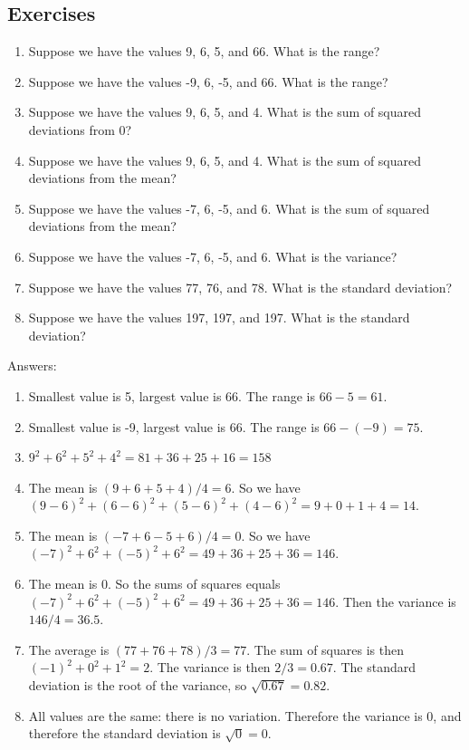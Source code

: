 \documentclass[]{report}\usepackage[]{graphicx}\usepackage[]{color}
\begin{document}
\subsection{Exercises}

\begin{enumerate}
\item Suppose we have the values 9, 6, 5, and 66. What is the range?
\item Suppose we have the values -9, 6, -5, and 66. What is the range?
\item Suppose we have the values 9, 6, 5, and 4. What is the sum of squared deviations from 0?
\item Suppose we have the values 9, 6, 5, and 4. What is the sum of squared deviations from the mean?
\item Suppose we have the values -7, 6, -5, and 6. What is the sum of squared deviations from the mean?
\item Suppose we have the values -7, 6, -5, and 6. What is the variance?
\item Suppose we have the values 77, 76, and 78. What is the standard deviation?
\item Suppose we have the values 197, 197, and 197. What is the standard deviation?
\end{enumerate}

Answers:


\begin{enumerate}
\item Smallest value is 5, largest value is 66. The range is $66-5=61$.
\item Smallest value is -9, largest value is 66. The range is $66-(-9)=75$.
\item $9^2+6^2+5^2+4^2=81+36+25+16=158$
\item The mean is $(9+6+5+4)/4=6$. So we have $(9-6)^2+(6-6)^2+(5-6)^2+(4-6)^2=9+0+1+4=14$.
\item The mean is $(-7+6-5+6)/4=0$. So we have $(-7)^2+6^2+(-5)^2+6^2=49+36+25+36=146$.
\item The mean is 0. So the sums of squares equals $(-7)^2+6^2+(-5)^2+6^2=49+36+25+36=146$. Then the variance is $146/4=36.5$.
\item The average is $(77+76+78)/3=77$. The sum of squares is then $(-1)^2+0^2+1^2=2$. The variance is then $2/3=0.67$. The standard deviation is the root of the variance, so $\sqrt{0.67}=0.82$.
\item All values are the same: there is no variation. Therefore the variance is 0, and therefore the standard deviation is $\sqrt{0}=0$.
\end{enumerate}
\end{document}
